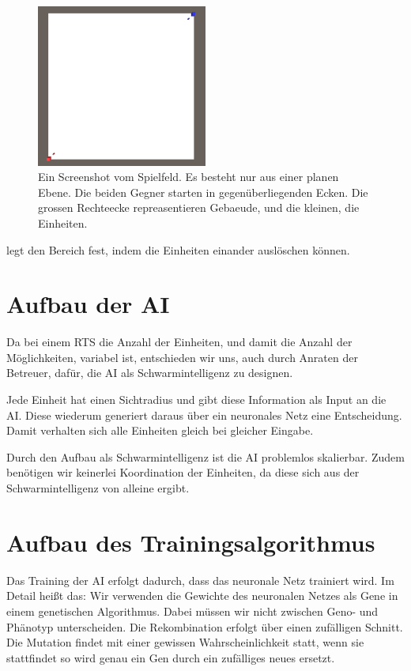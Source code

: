 \documentclass[
	12pt,
	a4paper,
	BCOR10mm,
	DIV14,
	headsepline,
	usegeometry,
]{scrreprt}
\begin{document}
\begin{figure}[h]
	\centering
	\includegraphics[width = 0.5\textwidth]{Spielfeld.png}
	\caption{Ein Screenshot vom Spielfeld. Es besteht nur aus einer planen Ebene. Die beiden Gegner starten in gegenüberliegenden Ecken. Die grossen Rechteecke repreasentieren Gebaeude, und die kleinen, die Einheiten.}
	\label{Spielfeld}
\end{figure}

 legt den Bereich fest, indem die Einheiten einander auslöschen können.


\section{Aufbau der AI}
Da bei einem RTS die Anzahl der Einheiten, und damit die Anzahl der Möglichkeiten, variabel ist, entschieden wir uns, auch durch Anraten der Betreuer, dafür, die AI als Schwarmintelligenz zu designen.

Jede Einheit hat einen Sichtradius und gibt diese Information als Input an die AI. 
Diese wiederum generiert daraus über ein neuronales Netz eine Entscheidung. 
Damit verhalten sich alle Einheiten gleich bei gleicher Eingabe. 

Durch den Aufbau als Schwarmintelligenz ist die AI problemlos skalierbar. 
Zudem benötigen wir keinerlei Koordination der Einheiten, da diese sich aus der Schwarmintelligenz von alleine ergibt.

\section{Aufbau des Trainingsalgorithmus}
Das Training der AI erfolgt dadurch, dass das neuronale Netz trainiert wird.
Im Detail heißt das: Wir verwenden die Gewichte des neuronalen Netzes als Gene in einem genetischen Algorithmus.
Dabei müssen wir nicht zwischen Geno- und Phänotyp unterscheiden.
Die Rekombination erfolgt über einen zufälligen Schnitt.
Die Mutation findet mit einer gewissen Wahrscheinlichkeit statt, wenn sie stattfindet so wird genau ein Gen durch ein zufälliges neues ersetzt.
\end{document}
